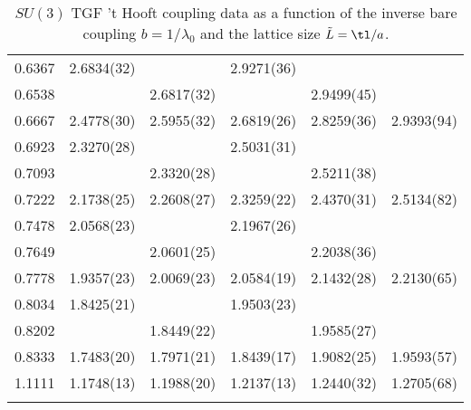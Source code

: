 \begin{longtable}{ c | c | c | c | c | c }
0.6367	&	2.6834(32)	&	 	&	2.9271(36)	&	 	&	 	\\
0.6538	&	 	&	2.6817(32)	&	 	&	2.9499(45)	&	 	\\
0.6667	&	2.4778(30)	&	2.5955(32)	&	2.6819(26)	&	2.8259(36)	&	2.9393(94)	\\
0.6923	&	2.3270(28)	&	 	&	2.5031(31)	&	 	&	 	\\
0.7093	&	 	&	2.3320(28)	&	 	&	2.5211(38)	&	 	\\
0.7222	&	2.1738(25)	&	2.2608(27)	&	2.3259(22)	&	2.4370(31)	&	2.5134(82)	\\
0.7478	&	2.0568(23)	&	 	&	2.1967(26)	&	 	&	 	\\
0.7649	&	 	&	2.0601(25)	&	 	&	2.2038(36)	&	 	\\
0.7778	&	1.9357(23)	&	2.0069(23)	&	2.0584(19)	&	2.1432(28)	&	2.2130(65)	\\
0.8034	&	1.8425(21)	&	 	&	1.9503(23)	&	 	&	 	\\
0.8202	&	 	&	1.8449(22)	&	 	&	1.9585(27)	&	 	\\
0.8333	&	1.7483(20)	&	1.7971(21)	&	1.8439(17)	&	1.9082(25)	&	1.9593(57)	\\
1.1111	&	1.1748(13)	&	1.1988(20)	&	1.2137(13)	&	1.2440(32)	&	1.2705(68)	\\
\bottomrule
\caption{$SU(3)$ TGF 't Hooft coupling data as a function of the inverse bare coupling $b=1/\lambda_0$ and the lattice size $\tilde{L}= \tl/a$.}
\label{apex_data:tab:data_total_su3}
\end{longtable}
